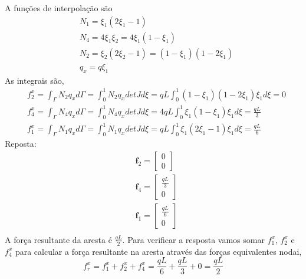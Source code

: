 %
A funções de interpolação são
%
\begin{equation}
	\begin{split}
		&N_1 = \xi_1 (2 \xi_1 - 1) \\ 
		&N_4 = 4 \xi_1 \xi_2 = 4 \xi_1 (1 - \xi_1)\\ 
		&N_2 = \xi_2 (2 \xi_2 - 1) = (1 - \xi_1) (1 - 2 \xi_1)\\
		&q_x = q \xi_1
	\end{split}  
\end{equation}
%
As integrais são,
\begin{equation}
	\begin{split}
		&f_2^x = \int_{\Gamma} N_2 q_x d\Gamma = \int_{0}^{1} N_2 q_x det J d\xi = q L \int_{0}^{1} (1 - \xi_1) (1 - 2 \xi_1) \xi_1 d\xi = 0\\
		&f_4^x = \int_{\Gamma} N_4 q_x d\Gamma = \int_{0}^{1} N_4 q_x det J d\xi = 4 q L \int_{0}^{1} \xi_1 (1 - \xi_1) \xi_1 d\xi =  \frac{q L}{3}\\
		&f_1^x = \int_{\Gamma} N_1 q_x d\Gamma = \int_{0}^{1} N_1 q_x det J d\xi = q L \int_{0}^{1} \xi_1 (2\xi_1 - 1) \xi_1  d\xi =  \frac{q L}{6}
	\end{split}
\end{equation}
%
\color{blue}
Reposta:
\begin{equation}
	\begin{split}
		&\mathbf{f}_2
		= 
		\begin{bmatrix}
			0\\
			0
		\end{bmatrix}\\
		&\mathbf{f}_4
		= 
		\begin{bmatrix}
			\frac{q L}{3}\\
			0
		\end{bmatrix}\\
		&\mathbf{f}_1
		= 
		\begin{bmatrix}
		\frac{q L}{6}\\
		0
	\end{bmatrix}\\	
	\end{split}
\end{equation} 
\color{black}
%
A força resultante da aresta é $\frac{q L}{2}$. Para verificar a resposta vamos somar $f_1^x$, $f_2^x$ e $f_4^x$ para calcular a força resultante na aresta através das forças equivalentes nodai,
%
\begin{equation}
	f_r^x = f_1^x + f_2^x + f_4^x = \frac{q L}{6} + \frac{q L}{3} + 0 = \frac{q L}{2}
\end{equation}


